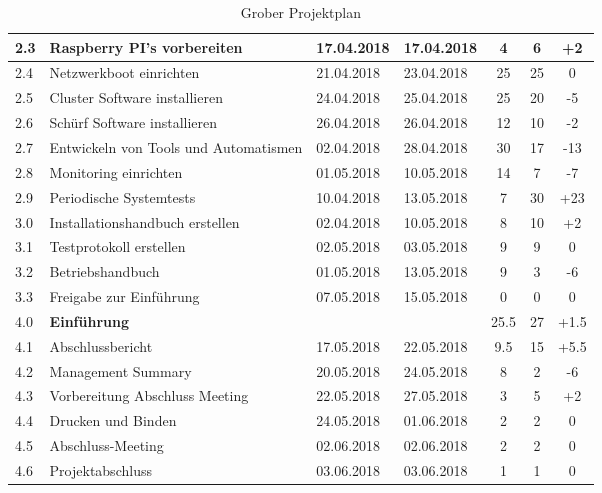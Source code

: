 \begin{table}[H]
\begin{tabular}{|p{0.7cm}p{6.8cm}p{2cm}p{2cm}|c|c|c|}
2.3 & Raspberry PI's vorbereiten & 17.04.2018 & 17.04.2018 & 4 & 6 & +2 \\\hline
2.4 & Netzwerkboot einrichten & 21.04.2018 & 23.04.2018 & 25 & 25 & 0 \\\hline
2.5 & Cluster Software installieren & 24.04.2018 & 25.04.2018 & 25 & 20 & -5 \\\hline
2.6 & Schürf Software installieren & 26.04.2018 & 26.04.2018 & 12 & 10 & -2 \\\hline
2.7 & Entwickeln von Tools und Automatismen & 02.04.2018 & 28.04.2018 & 30 & 17 &  -13 \\\hline
2.8 & Monitoring einrichten & 01.05.2018 & 10.05.2018 & 14 & 7 & -7\\\hline
2.9 & Periodische Systemtests & 10.04.2018 & 13.05.2018 & 7 & 30 & +23\\\hline
3.0 & Installationshandbuch erstellen & 02.04.2018 & 10.05.2018 & 8 & 10 & +2  \\\hline
3.1 & Testprotokoll erstellen & 02.05.2018 & 03.05.2018 & 9 & 9 & 0 \\\hline
3.2 & Betriebshandbuch & 01.05.2018 & 13.05.2018 & 9 & 3 & -6\\\hline
3.3 & Freigabe zur Einführung & 07.05.2018 & 15.05.2018 & 0 & 0 & 0 \\\hline
\rowcolor{subheading} 4.0 & \textbf{Einführung} & & & 25.5 & 27 & +1.5 \\\hline
4.1 & Abschlussbericht & 17.05.2018 & 22.05.2018 & 9.5 & 15 & +5.5 \\\hline
4.2 & Management Summary & 20.05.2018 & 24.05.2018 & 8 & 2 & -6 \\\hline
4.3 & Vorbereitung  Abschluss Meeting & 22.05.2018 & 27.05.2018 & 3 & 5 & +2 \\\hline
4.4 & Drucken und Binden & 24.05.2018 & 01.06.2018 & 2 & 2 & 0 \\\hline
4.5 & Abschluss-Meeting & 02.06.2018 & 02.06.2018 & 2 & 2 & 0 \\\hline
4.6 & Projektabschluss & 03.06.2018 & 03.06.2018 & 1 & 1 & 0 \\\hline
\end{tabular}
\caption{Grober Projektplan}
\end{table}

